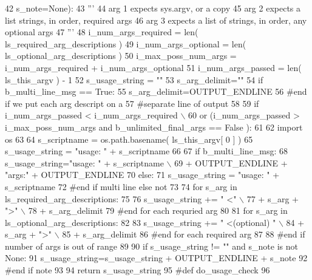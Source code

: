 \begin{DoxyCode}
42         s\_note=\textcolor{keywordtype}{None}):
43     \textcolor{stringliteral}{'''}
44 \textcolor{stringliteral}{    arg 1 expects sys.argv, or a copy}
45 \textcolor{stringliteral}{    arg 2 expects a list strings, in order, required args}
46 \textcolor{stringliteral}{    arg 3 expects a list of strings, in order, any optional args}
47 \textcolor{stringliteral}{    '''}
48     i\_num\_args\_required = len( ls\_required\_arg\_descriptions )
49     i\_num\_args\_optional = len( ls\_optional\_arg\_descriptions )
50     i\_max\_poss\_num\_args = i\_num\_args\_required + i\_num\_args\_optional 
51     i\_num\_args\_passed = len( ls\_this\_argv ) - 1  
52     s\_usage\_string = \textcolor{stringliteral}{""}
53     s\_arg\_delimit=\textcolor{stringliteral}{""}
54     \textcolor{keywordflow}{if} b\_multi\_line\_msg == \textcolor{keyword}{True}:
55         s\_arg\_delimit=OUTPUT\_ENDLINE
56     \textcolor{comment}{#end if we put each arg descript on a }
57     \textcolor{comment}{#separate line of output}
58 
59     \textcolor{keywordflow}{if} i\_num\_args\_passed <  i\_num\_args\_required  \(\backslash\)
60             \textcolor{keywordflow}{or} (i\_num\_args\_passed > i\_max\_poss\_num\_args \textcolor{keywordflow}{and} b\_unlimited\_final\_args == \textcolor{keyword}{False} ): 
61     
62         \textcolor{keyword}{import} os
63         
64         s\_scriptname = os.path.basename( ls\_this\_argv[ 0 ] )    
65         s\_usage\_string = \textcolor{stringliteral}{"usage: "} + s\_scriptname 
66 
67         \textcolor{keywordflow}{if} b\_multi\_line\_msg:
68             s\_usage\_string=\textcolor{stringliteral}{"usage: "} + s\_scriptname \(\backslash\)
69                     + OUTPUT\_ENDLINE + \textcolor{stringliteral}{"args:"} + OUTPUT\_ENDLINE
70         \textcolor{keywordflow}{else}:
71             s\_usage\_string = \textcolor{stringliteral}{"usage: "} + s\_scriptname 
72         \textcolor{comment}{#end if multi line else not}
73 
74         \textcolor{keywordflow}{for} s\_arg \textcolor{keywordflow}{in} ls\_required\_arg\_descriptions:
75 
76             s\_usage\_string += \textcolor{stringliteral}{" <"} \(\backslash\)
77                 + s\_arg + \textcolor{stringliteral}{">"} \(\backslash\)
78                 + s\_arg\_delimit
79         \textcolor{comment}{#end for each requried arg}
80 
81         \textcolor{keywordflow}{for} s\_arg \textcolor{keywordflow}{in} ls\_optional\_arg\_descriptions:
82 
83             s\_usage\_string += \textcolor{stringliteral}{" <(optional) "} \(\backslash\)
84                 + s\_arg + \textcolor{stringliteral}{">"} \(\backslash\)
85                 + s\_arg\_delimit
86         \textcolor{comment}{#end for each required arg}
87 
88     \textcolor{comment}{#end if number of args is out of range}
89 
90     \textcolor{keywordflow}{if} s\_usage\_string != \textcolor{stringliteral}{""} \textcolor{keywordflow}{and} s\_note \textcolor{keywordflow}{is} \textcolor{keywordflow}{not} \textcolor{keywordtype}{None}:
91         s\_usage\_string=s\_usage\_string + OUTPUT\_ENDLINE + s\_note
92     \textcolor{comment}{#end if note }
93 
94     \textcolor{keywordflow}{return}  s\_usage\_string 
95 \textcolor{comment}{#def do\_usage\_check}
96 
\end{DoxyCode}
